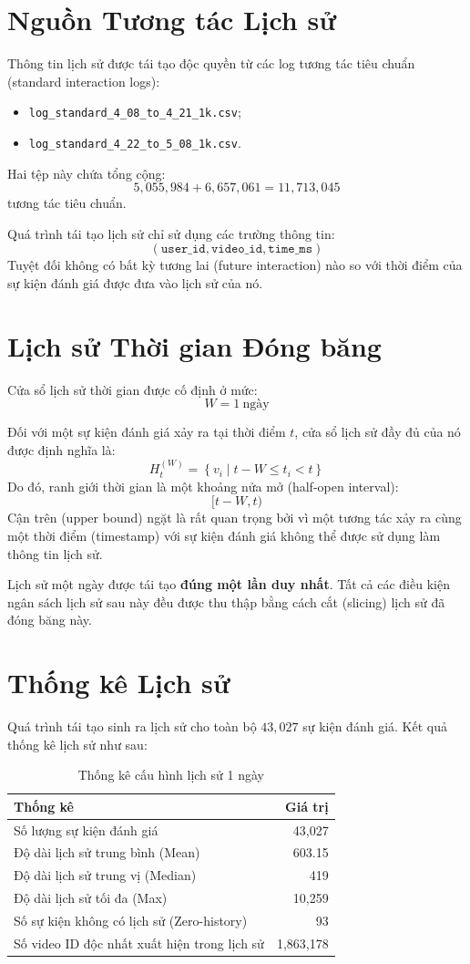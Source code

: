 \documentclass[12pt,a4paper]{article}
\begin{document}
\section{Nguồn Tương tác Lịch sử}
Thông tin lịch sử được tái tạo độc quyền từ các log tương tác tiêu chuẩn (standard interaction logs):
\begin{itemize}[noitemsep]
    \item \texttt{log\_standard\_4\_08\_to\_4\_21\_1k.csv};
    \item \texttt{log\_standard\_4\_22\_to\_5\_08\_1k.csv}.
\end{itemize}

Hai tệp này chứa tổng cộng:
\[
5{,}055{,}984 + 6{,}657{,}061 = 11{,}713{,}045
\]
tương tác tiêu chuẩn.

Quá trình tái tạo lịch sử chỉ sử dụng các trường thông tin:
\[
(\texttt{user\_id}, \texttt{video\_id}, \texttt{time\_ms})
\]
Tuyệt đối không có bất kỳ tương lai (future interaction) nào so với thời điểm của sự kiện đánh giá được đưa vào lịch sử của nó.

\section{Lịch sử Thời gian Đóng băng}
Cửa sổ lịch sử thời gian được cố định ở mức:
\[
W = 1\ \mathrm{ngày}
\]

Đối với một sự kiện đánh giá xảy ra tại thời điểm $t$, cửa sổ lịch sử đầy đủ của nó được định nghĩa là:
\[
H_t^{(W)} = \left\{ v_i \mid t-W \leq t_i < t \right\}
\]
Do đó, ranh giới thời gian là một khoảng nửa mở (half-open interval):
\[
[t-W, t)
\]
Cận trên (upper bound) ngặt là rất quan trọng bởi vì một tương tác xảy ra cùng một thời điểm (timestamp) với sự kiện đánh giá không thể được sử dụng làm thông tin lịch sử.

Lịch sử một ngày được tái tạo \textbf{đúng một lần duy nhất}. Tất cả các điều kiện ngân sách lịch sử sau này đều được thu thập bằng cách cắt (slicing) lịch sử đã đóng băng này.

\section{Thống kê Lịch sử}
Quá trình tái tạo sinh ra lịch sử cho toàn bộ $43{,}027$ sự kiện đánh giá. Kết quả thống kê lịch sử như sau:

\begin{table}[h]
\centering
\caption{Thống kê cấu hình lịch sử 1 ngày}
\label{tab:history-stats}
\begin{tabular}{lr}
\toprule
\textbf{Thống kê} & \textbf{Giá trị} \\
\midrule
Số lượng sự kiện đánh giá & 43,027 \\
Độ dài lịch sử trung bình (Mean) & 603.15 \\
Độ dài lịch sử trung vị (Median) & 419 \\
Độ dài lịch sử tối đa (Max) & 10,259 \\
Số sự kiện không có lịch sử (Zero-history) & 93 \\
Số video ID độc nhất xuất hiện trong lịch sử & 1,863,178 \\
\bottomrule
\end{tabular}
\end{table}
\end{document}
